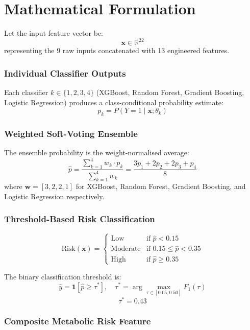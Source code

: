 \documentclass[12pt,a4paper]{report}
\begin{document}
\appendix
\chapter{Mathematical Formulation}

Let the input feature vector be:
\[
\mathbf{x} \in \mathbb{R}^{22}
\]
representing the 9 raw inputs concatenated with 13 engineered features.

\subsection*{Individual Classifier Outputs}

Each classifier $k \in \{1,2,3,4\}$ (XGBoost, Random Forest, Gradient Boosting, Logistic Regression) produces a class-conditional probability estimate:
\[
p_k = P(Y=1 \mid \mathbf{x}; \theta_k)
\]

\subsection*{Weighted Soft-Voting Ensemble}

The ensemble probability is the weight-normalised average:
\[
\hat{p} = \frac{\sum_{k=1}^{4} w_k \cdot p_k}{\sum_{k=1}^{4} w_k} = \frac{3p_1 + 2p_2 + 2p_3 + p_4}{8}
\]
where $\mathbf{w} = [3, 2, 2, 1]$ for XGBoost, Random Forest, Gradient Boosting, and Logistic Regression respectively.

\subsection*{Threshold-Based Risk Classification}

\[
\text{Risk}(\mathbf{x}) =
\begin{cases}
\text{Low} & \text{if } \hat{p} < 0.15 \\
\text{Moderate} & \text{if } 0.15 \le \hat{p} < 0.35 \\
\text{High} & \text{if } \hat{p} \ge 0.35
\end{cases}
\]

The binary classification threshold is:
\[
\hat{y} = \mathbf{1}[\hat{p} \ge \tau^*], \quad \tau^* = \arg\max_{\tau \in [0.05, 0.50]} F_1(\tau)
\]
\[
\tau^* = 0.43
\]

\subsection*{Composite Metabolic Risk Feature}
\end{document}
